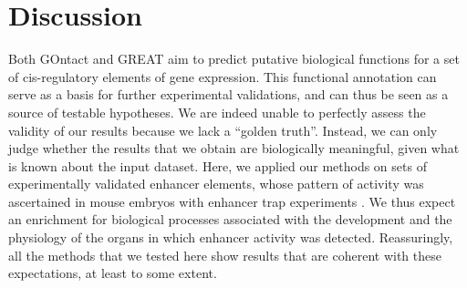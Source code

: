 \section{Discussion}
Both GOntact and GREAT aim to predict putative biological functions for a set of \gls{cis}-regulatory elements of gene expression. This functional annotation can serve as a basis for further experimental validations, and can thus be seen as a source of testable hypotheses. We are indeed unable to perfectly assess the validity of our results because we lack a “golden truth”. Instead, we can only judge whether the results that we obtain are biologically meaningful, given what is known about the input dataset. Here, we applied our methods on sets of experimentally validated enhancer elements, whose pattern of activity was ascertained in mouse embryos with enhancer trap experiments \citep{visel_vista_2007}. We thus expect an enrichment for biological processes associated with the development and the physiology of the organs in which enhancer activity was detected. Reassuringly, all the methods that we tested here show results that are coherent with these expectations, at least to some extent. \\

